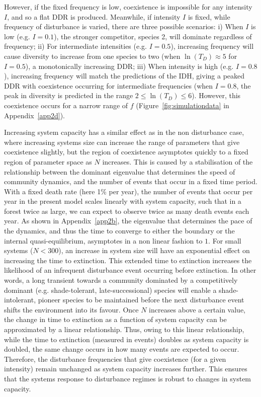However, if the fixed frequency is low, coexistence is impossible for any intensity $I$, and so a flat DDR is produced. Meanwhile, if intensity $I$ is fixed, while frequency of disturbance is varied, there are three possible scenarios: i) When $I$ is low (e.g. $I=0.1$), the stronger competitor, species 2, will dominate regardless of frequency; ii) For intermediate intensities (e.g. $I=0.5$), increasing frequency will cause diversity to increase from one species to two (when $\ln(T_D)\approx 5$ for $I=0.5$), a monotonically increasing DDR; iii) When intensity is high (e.g. $I=0.8$), increasing frequency will match the predictions of the IDH, giving a peaked DDR with coexistence occurring for intermediate frequencies (when $I=0.8$, the peak in diversity is predicted in the range $2\leq \ln(T_D) \leq 6$). However, this coexistence occurs for a narrow range of $f$ (Figure~\ref{fig:simulationdata} in Appendix~\ref{app2d}). 

Increasing system capacity has a similar effect as in the non disturbance case, where increasing systems size can increase the range of parameters that give coexistence slightly, but the region of coexistence asymptotes quickly to a fixed region of parameter space as $N$ increases. This is caused by a stabilisation of the relationship between the dominant eigenvalue that determines the speed of community dynamics, and the number of events that occur in a fixed time period. With a fixed death rate (here 1\% per year), the number of events that occur per year in the present model scales linearly with system capacity, such that in a forest twice as large, we can expect to observe twice as many death events each year. As shown in Appendix~\ref{app2b}, the eigenvalue that determines the pace of the dynamics, and thus the time to converge to either the boundary or the internal quasi-equilibrium, asymptotes in a non linear fashion to $1$. For small systems ($N<300$), an increase in system size will have an exponential effect on increasing the time to extinction. This extended time to extinction increases the likelihood of an infrequent disturbance event occurring before extinction. In other words, a long transient towards a community dominated by a competitively dominant (e.g. shade-tolerant, late-successional) species will enable a shade-intolerant, pioneer species to be maintained before the next disturbance event shifts the environment into its favour. Once $N$ increases above a certain value, the change in time to extinction as a function of system capacity can be approximated by a linear relationship. Thus, owing to this linear relationship, while the time to extinction (measured in events) doubles as system capacity is doubled, the same change occurs in how many events are expected to occur. Therefore, the disturbance frequencies that give coexistence (for a given intensity) remain unchanged as system capacity increases further. This ensures that the systems response to disturbance regimes is robust to changes in system capacity.

